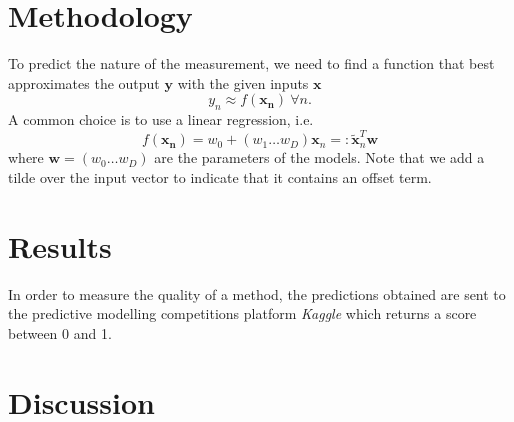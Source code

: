 \documentclass[10pt,conference,compsocconf]{IEEEtran}
\newcommand{\xx}{\mathbf{x}}
\newcommand{\yy}{\mathbf{y}}
\newcommand{\ww}{\mathbf{w}}
\begin{document}
\section{Methodology}
To predict the nature of the measurement, we need to find a function that best approximates the output $\yy$ with the given inputs $\xx$
\begin{equation}
y_n \approx f(\mathbf{x_n}) \ \forall n.
\end{equation}
A common choice is to use a linear regression, i.e.
\begin{equation}
f(\mathbf{x_n}) = w_0 +   (w_1 \ldots w_D) \xx_n =: \tilde{\xx}_n^T \ww
\end{equation}
where $\ww = (w_0 \ldots w_D)$ are the parameters of the models. Note that we add a tilde over the input vector to indicate that it contains an offset term.\\


\section{Results}
In order to measure the quality of a method, the predictions obtained are sent to the predictive modelling competitions platform \textit{Kaggle} which returns a score between 0 and 1.\\
\section{Discussion}
\end{document}
